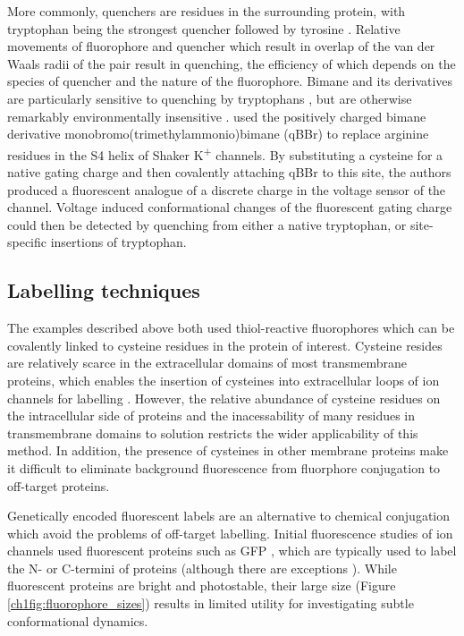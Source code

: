 More commonly, quenchers are residues in the surrounding protein, with tryptophan being the strongest quencher followed by tyrosine \cite{marme_inter-_2003, lakowicz_principles_2006}.
Relative movements of fluorophore and quencher which result in overlap of the van der Waals radii of the pair result in quenching, the efficiency of which depends on the species of quencher and the nature of the fluorophore.
Bimane and its derivatives are particularly sensitive to quenching by tryptophans \cite{mansoor_distance_2010}, but are otherwise remarkably environmentally insensitive \cite{mansoor_determination_1999}.
\citeauthor{priest_trajectory_2020} used the positively charged bimane derivative monobromo(trimethylammonio)bimane (qBBr) to replace arginine residues in the S4 helix of Shaker K\textsuperscript{+} channels.
By substituting a cysteine for a native gating charge and then covalently attaching qBBr to this site, the authors produced a fluorescent analogue of a discrete charge in the voltage sensor of the channel.
Voltage induced conformational changes of the fluorescent gating charge could then be detected by quenching from either a native tryptophan, or site-specific insertions of tryptophan.

\subsection{Labelling techniques}

The examples described above both used thiol-reactive fluorophores which can be covalently linked to cysteine residues in the protein of interest.
Cysteine resides are relatively scarce in the extracellular domains of most transmembrane proteins, which enables the insertion of cysteines into extracellular loops of ion channels for labelling \cite{mannuzzu_direct_1996, cha_characterizing_1997, cowgill_contribution_2019, braun_current_2020}.
However, the relative abundance of cysteine residues on the intracellular side of proteins and the inacessability of many residues in transmembrane domains to solution restricts the wider applicability of this method.
In addition, the presence of cysteines in other membrane proteins make it difficult to eliminate background fluorescence from fluorphore conjugation to off-target proteins.

Genetically encoded fluorescent labels are an alternative to chemical conjugation which avoid the problems of off-target labelling.
Initial fluorescence studies of ion channels used fluorescent proteins such as GFP \cite{siegel_genetically_1997}, which are typically used to label the N- or C-termini of proteins (although there are exceptions \cite{giraldez_generation_2005, miranda_state-dependent_2013}).
While fluorescent proteins are bright and photostable, their large size (Figure \ref{ch1fig:fluorophore_sizes}) results in limited utility for investigating subtle conformational dynamics.

